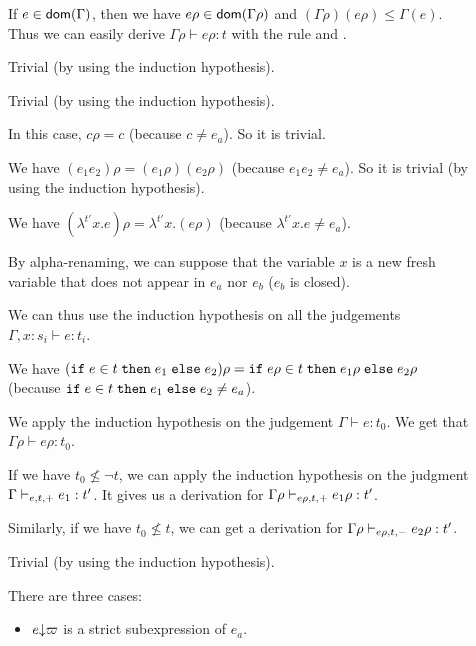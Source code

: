 \documentclass[a4paper]{article}
\theoremstyle{definition}
\begin{document}
        \begin{description}
          \item[] If $e\in\dom\Gamma$, then we have $e\rho\in\dom{\Gamma\rho}$ and $(\Gamma\rho)(e\rho)\leq\Gamma(e)$.
          Thus we can easily derive $\Gamma\rho\vdash e\rho:t$ with the rule  and .
          \item[] Trivial (by using the induction hypothesis).
          \item[] Trivial (by using the induction hypothesis).
          \item[] In this case, $c\rho = c$ (because $c \neq e_a$). So it is trivial.
          \item[] We have $(e_1 e_2)\rho = (e_1\rho) (e_2\rho)$ (because $e_1 e_2 \neq e_a$).
          So it is trivial (by using the induction hypothesis).
          \item[] We have $(\lambda^{t'}x.e)\rho = \lambda^{t'}x.(e\rho)$ (because $\lambda^{t'}x.e \neq e_a$).
          
          By alpha-renaming, we can suppose that the variable $x$ is a new fresh variable that does not appear
          in $e_a$ nor $e_b$ ($e_b$ is closed).
          
          We can thus use the induction hypothesis on all the judgements $\Gamma, x:s_i \vdash e:t_i$.
          \item[]
          We have $(\ite e t {e_1} {e_2})\rho = \ite {e\rho} t {e_1\rho} {e_2\rho}$ (because $\ite e t {e_1} {e_2} \neq e_a$).

          We apply the induction hypothesis on the judgement $\Gamma\vdash e:t_0$.
          We get that $\Gamma\rho\vdash e\rho:t_0$.

          If we have $t_0\not\leq\neg t$, we can apply the induction hypothesis on the judgment $\Gamma\cvdash + e t e_1:t'$.
          It gives us a derivation for $\Gamma\rho\cvdash + {e\rho} t e_1\rho:t'$.

          Similarly, if we have $t_0\not\leq t$, we can get a derivation for $\Gamma\rho\cvdash - {e\rho} t e_2\rho:t'$.
          \item[] Trivial (by using the induction hypothesis).
          \item[] There are three cases:
          \begin{itemize}
            \item $\occ e \varpi$ is a strict subexpression of $e_a$.
            

\end{itemize}
\end{description}
\end{document}
